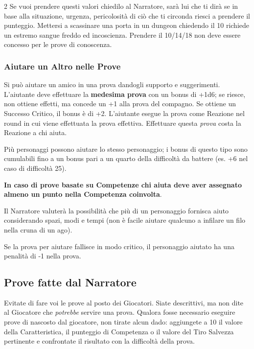 \begin{multicols}{2}
Se vuoi prendere questi valori chiedilo al Narratore, sarà lui che ti dirà se in base alla situazione, urgenza, pericolosità di ciò che ti circonda riesci a prendere il punteggio. Mettersi a scassinare una porta in un dungeon chiedendo il 10 richiede un estremo sangue freddo ed incoscienza. Prendere il 10/14/18 non deve essere concesso per le prove di conoscenza.

\subsubsection{Aiutare un Altro nelle Prove}\label{aiutarealtro}

Si può aiutare un amico in una prova dandogli supporto e suggerimenti. L'aiutante deve effettuare la \textbf{medesima prova} con un bonus di +1d6; se riesce, non ottiene effetti, ma concede un +1 alla prova del compagno. Se ottiene un Successo Critico, il bonus è di +2. L'aiutante esegue la prova come Reazione nel round in cui viene effettuata la prova effettiva. Effettuare questa \textit{prova} costa la Reazione a chi aiuta.

Più personaggi possono aiutare lo stesso personaggio; i bonus di questo tipo sono cumulabili fino a un bonus pari a un quarto della difficoltà da battere (es. +6 nel caso di difficoltà 25).

\textbf{In caso di prove basate su Competenze chi aiuta deve aver assegnato almeno un punto nella Competenza coinvolta}.

Il Narratore valuterà la possibilità che più di un personaggio fornisca aiuto considerando spazi, modi e tempi (non è facile aiutare qualcuno a infilare un filo nella cruna di un ago).

Se la prova per aiutare fallisce in modo critico, il personaggio aiutato ha una penalità di -1 nella prova.

\subsection{Prove fatte dal Narratore}\label{provefattedalnarratore}

Evitate di fare voi le prove al posto dei Giocatori. Siate descrittivi, ma non dite al Giocatore che \emph{potrebbe} servire una prova. Qualora fosse necessario eseguire prove di nascosto dal giocatore, non tirate alcun dado: aggiungete a 10 il valore della Caratteristica, il punteggio di Competenza o il valore del Tiro Salvezza pertinente e confrontate il risultato con la difficoltà della prova.


\end{multicols}
